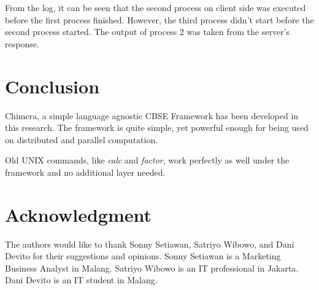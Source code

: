 \documentclass[conference]{IEEEtran}
\begin{document}
From the log, it can be seen that the second process on client side was executed before the first process finished.
However, the third process didn't start before the second process started. The output of process 2  was taken from the
server's response.

\section{Conclusion}

Chimera, a simple language agnostic CBSE Framework has been developed in this research. The framework is quite simple, yet powerful enough for being used on distributed and parallel computation.

Old UNIX commands, like {\it calc} and {\it factor}, work perfectly as well under the framework and
no additional layer needed.


\section*{Acknowledgment}

The authors would like to thank Sonny Setiawan, Satriyo Wibowo, and Dani Devito for
their suggestions and opinions. Sonny Setiawan is a Marketing Business Analyst in Malang.
Satriyo Wibowo is an IT professional in Jakarta. Dani Devito is an IT student in Malang.

\ifCLASSOPTIONcaptionsoff
  \newpage
\fi




\end{document}
